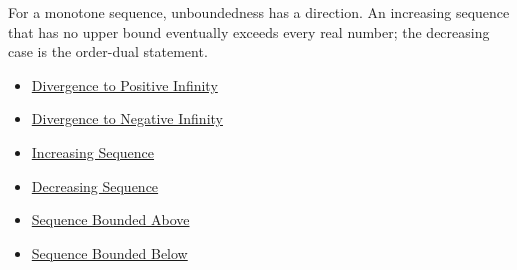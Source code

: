 \begin{remark*}[Interpretation]
For a monotone sequence, unboundedness has a direction. An increasing sequence
that has no upper bound eventually exceeds every real number; the decreasing
case is the order-dual statement.
\end{remark*}

\begin{dependencies}
\begin{itemize}
  \item \hyperref[def:diverges-to-positive-infinity]{Divergence to Positive Infinity}
  \item \hyperref[def:diverges-to-negative-infinity]{Divergence to Negative Infinity}
  \item \hyperref[def:increasing-sequence]{Increasing Sequence}
  \item \hyperref[def:decreasing-sequence]{Decreasing Sequence}
  \item \hyperref[def:sequence-bounded-above]{Sequence Bounded Above}
  \item \hyperref[def:sequence-bounded-below]{Sequence Bounded Below}
\end{itemize}
\end{dependencies}


